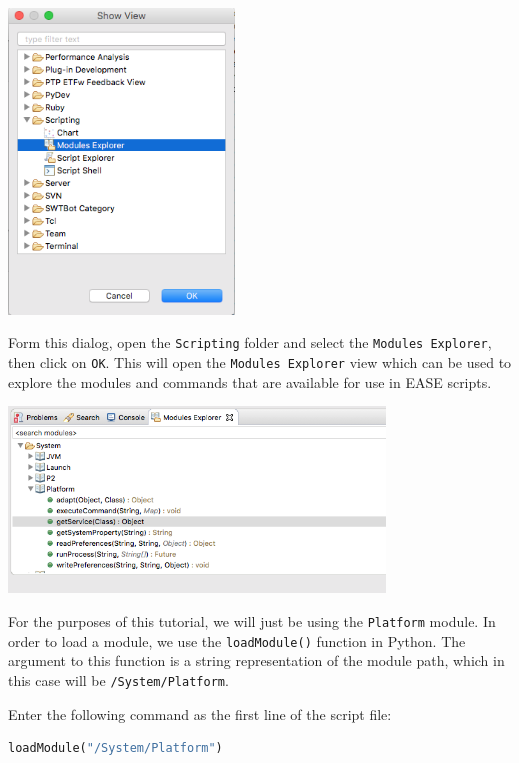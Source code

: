 \documentclass{article}
\begin{document}
\begin{center}
\includegraphics[width=6cm]{images/showview}
\end{center}

Form this dialog, open the \texttt{Scripting} folder and select the
\texttt{Modules Explorer}, then click on \texttt{OK}. This will open the
\texttt{Modules Explorer} view which can be used to explore the modules and commands
that are available for use in EASE scripts.

\begin{center}
\includegraphics[width=10cm]{images/modulesexplorer}
\end{center}

For the purposes of this tutorial, we will just be using the
\texttt{Platform} module. In order to load a module, we use the
\texttt{loadModule()} function in Python. The argument to this function is a
string representation of the module path, which in this case will be
\texttt{/System/Platform}. 

Enter the following command as the first line of the script file:

\lstset{basicstyle=\ttfamily\small, breaklines}

\begin{lstlisting}[frame=single,language=Python]
loadModule("/System/Platform")
\end{lstlisting}
\end{document}

